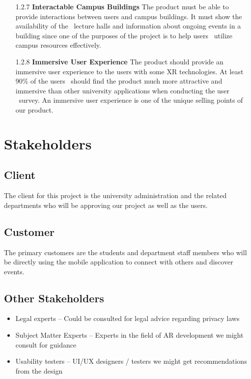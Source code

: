 \documentclass[12pt]{article}
\begin{document}
\begin{itemize}
  \item[1.2.7] \textbf{Interactable Campus Buildings}
  The product must be able to provide interactions between users and campus buildings. It must show the availability of the \
  lecture halls and information about ongoing events in a building since one of the purposes of the project is to help users \
  utilize campus resources effectively.

  \item[1.2.8] \textbf{Immersive User Experience}
  The product should provide an immersive user experience to the users with some XR technologies. At least 90\% of the users \
  should find the product much more attractive and immersive than other university applications when conducting the user \
  survey. An immersive user experience is one of the unique selling points of our product.

\end{itemize}

\section{Stakeholders}
\subsection{Client}

The client for this project is the university administration and the related departments who will be approving our project as well as the users.

\subsection{Customer}

The primary customers are the students and department staff members who will be directly using the mobile application to connect with others and discover events.

\subsection{Other Stakeholders}

\begin{itemize}
\item Legal experts – Could be consulted for legal advice regarding privacy laws
\item Subject Matter Experts – Experts in the field of AR development we might consult for guidance
\item Usability testers – UI/UX designers / testers we might get recommendations from the design
\end{itemize}
\end{document}
